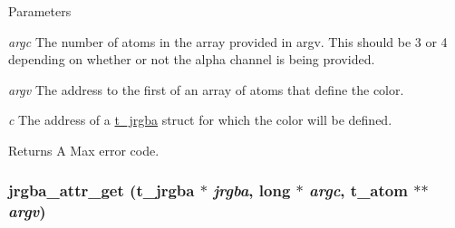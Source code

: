 \begin{DoxyParams}{Parameters}
\item[{\em argc}]The number of atoms in the array provided in argv. This should be 3 or 4 depending on whether or not the alpha channel is being provided. \item[{\em argv}]The address to the first of an array of atoms that define the color. \item[{\em c}]The address of a \hyperlink{structt__jrgba}{t\_\-jrgba} struct for which the color will be defined. \end{DoxyParams}
\begin{DoxyReturn}{Returns}
A Max error code. 
\end{DoxyReturn}
\hypertarget{group__color_ga27b52b9c7e3b8e9fafccdfcb4caee127}{
\subsubsection[{jrgba\_\-attr\_\-get}]{ jrgba\_\-attr\_\-get ({\bf t\_\-jrgba} $\ast$ {\em jrgba}, \/  long $\ast$ {\em argc}, \/  {\bf t\_\-atom} $\ast$$\ast$ {\em argv})}}
\label{group__color_ga27b52b9c7e3b8e9fafccdfcb4caee127}


